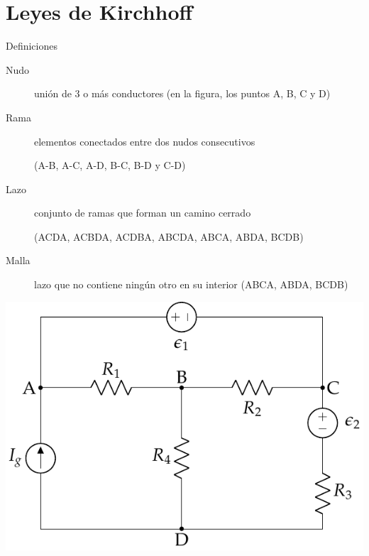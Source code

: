 \documentclass[aspectratio=169, xcolor={usenames,svgnames,dvipsnames}]{beamer}
\begin{document}

\section{Leyes de Kirchhoff}

\begin{frame}{Definiciones} \label{definiciones_mallas}
    \begin{description}
        \item[{Nudo}] \hspace{2mm}unión de \alert{3} o más conductores \hspace{3mm}(en la figura, los puntos A, B, C y D)
        \item[{Rama}] \hspace{2mm}elementos conectados entre dos nudos consecutivos 
        
        \hspace{2mm}(A-B, A-C, A-D, B-C, B-D y C-D)
        \item[{Lazo}] \hspace{2mm}conjunto de ramas que forman un camino cerrado
        
        \hspace{2mm}(ACDA, ACBDA, ACDBA, ABCDA, ABCA, ABDA, BCDB)
        \item[{Malla}] \hspace{2mm}lazo que no contiene ningún otro en su interior 
        \hspace{3mm}(ABCA, ABDA, BCDB)
    \end{description}

    \begin{center}
        \includegraphics[height=0.5\textheight]{../figs/mallas.pdf}
    \end{center}
\end{frame}
\end{document}
